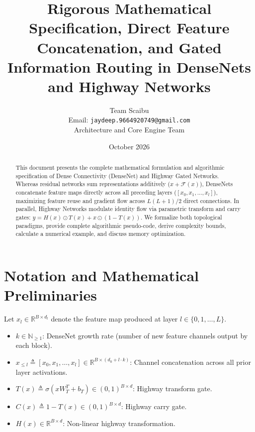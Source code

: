 \documentclass[11pt,a4paper]{article}
\title{\textbf{Rigorous Mathematical Specification, Direct Feature Concatenation, and Gated Information Routing in DenseNets and Highway Networks}}
\author{Team Scaibu \\ \small Email: \texttt{jaydeep.9664920749@gmail.com} \\ \small Architecture and Core Engine Team}
\date{October 2026}
\theoremstyle{definition}
\begin{document}
\maketitle

\begin{abstract}
This document presents the complete mathematical formulation and algorithmic specification of Dense Connectivity (DenseNet) and Highway Gated Networks. Whereas residual networks sum representations additively ($x + \mathcal{F}(x)$), DenseNets concatenate feature maps directly across all preceding layers ($[x_0, x_1, \dots, x_l]$), maximizing feature reuse and gradient flow across $L(L+1)/2$ direct connections. In parallel, Highway Networks modulate identity flow via parametric transform and carry gates: $y = H(x) \odot T(x) + x \odot (1 - T(x))$. We formalize both topological paradigms, provide complete algorithmic pseudo-code, derive complexity bounds, calculate a numerical example, and discuss memory optimization.
\end{abstract}

\section{Notation and Mathematical Preliminaries}

Let $x_l \in \mathbb{R}^{B \times d_l}$ denote the feature map produced at layer $l \in \{0, 1, \dots, L\}$.

\begin{itemize}
    \item $k \in \mathbb{N}_{\ge 1}$: DenseNet growth rate (number of new feature channels output by each block).
    \item $x_{\le l} \triangleq [x_0, x_1, \dots, x_l] \in \mathbb{R}^{B \times (d_0 + l \cdot k)}$: Channel concatenation across all prior layer activations.
    \item $T(x) \triangleq \sigma(x W_T^T + b_T) \in (0, 1)^{B \times d}$: Highway transform gate.
    \item $C(x) \triangleq 1 - T(x) \in (0, 1)^{B \times d}$: Highway carry gate.
    \item $H(x) \in \mathbb{R}^{B \times d}$: Non-linear highway transformation.
\end{itemize}
\end{document}
